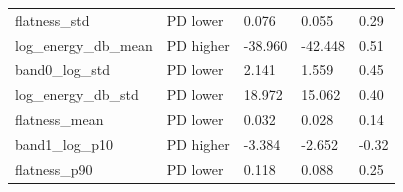 \documentclass[11pt,a4paper]{article}
\begin{document}
\begin{center}
\begin{longtable}{>{\raggedright\arraybackslash}p{4.20cm}>{\raggedright\arraybackslash}p{2.55cm}>{\raggedleft\arraybackslash}p{2.55cm}>{\raggedleft\arraybackslash}p{2.55cm}>{\raggedleft\arraybackslash}p{2.55cm}}
\hspace{0pt}flatness\_\allowbreak{}std & \hspace{0pt}PD lower & \hspace{0pt}0.076 & \hspace{0pt}0.055 & \hspace{0pt}0.29\\
\hspace{0pt}log\_\allowbreak{}energy\_\allowbreak{}db\_\allowbreak{}mean & \hspace{0pt}PD higher & \hspace{0pt}-38.960 & \hspace{0pt}-42.448 & \hspace{0pt}0.51\\
\hspace{0pt}band0\_\allowbreak{}log\_\allowbreak{}std & \hspace{0pt}PD lower & \hspace{0pt}2.141 & \hspace{0pt}1.559 & \hspace{0pt}0.45\\
\hspace{0pt}log\_\allowbreak{}energy\_\allowbreak{}db\_\allowbreak{}std & \hspace{0pt}PD lower & \hspace{0pt}18.972 & \hspace{0pt}15.062 & \hspace{0pt}0.40\\
\hspace{0pt}flatness\_\allowbreak{}mean & \hspace{0pt}PD lower & \hspace{0pt}0.032 & \hspace{0pt}0.028 & \hspace{0pt}0.14\\
\hspace{0pt}band1\_\allowbreak{}log\_\allowbreak{}p10 & \hspace{0pt}PD higher & \hspace{0pt}-3.384 & \hspace{0pt}-2.652 & \hspace{0pt}-0.32\\
\hspace{0pt}flatness\_\allowbreak{}p90 & \hspace{0pt}PD lower & \hspace{0pt}0.118 & \hspace{0pt}0.088 & \hspace{0pt}0.25\\

\end{longtable}
\end{center}
\end{document}
